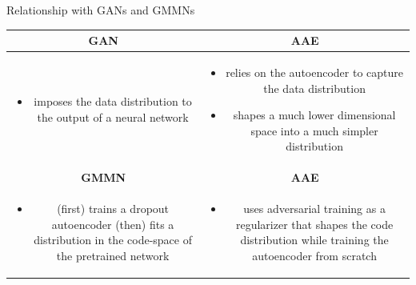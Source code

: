 \documentclass[10pt]{beamer}
\begin{document}
\begin{frame}{Relationship with GANs and GMMNs}
\centering
\begin{tabular}{c c}
  \textbf{GAN} & \textbf{AAE} \\ \hline
  \parbox{0.45\linewidth}{\begin{itemize}
      \item imposes the data distribution to the output of a neural network
    \end{itemize}} &
  \parbox{0.45\linewidth}{\begin{itemize}
      \item relies on the autoencoder to capture the data distribution
      \item shapes a much lower dimensional space into a much simpler distribution
    \end{itemize}} \\
  \textbf{GMMN} & \textbf{AAE} \\ \hline
  \parbox{0.45\linewidth}{\begin{itemize}
      \item (first) trains a dropout autoencoder (then) fits a distribution in the code-space of the pretrained network
  \end{itemize}} &
  \parbox{0.45\linewidth}{\begin{itemize}
      \item uses adversarial training as a regularizer that shapes the code distribution while training the autoencoder from scratch
  \end{itemize}}
\end{tabular}
\end{frame}
\end{document}
